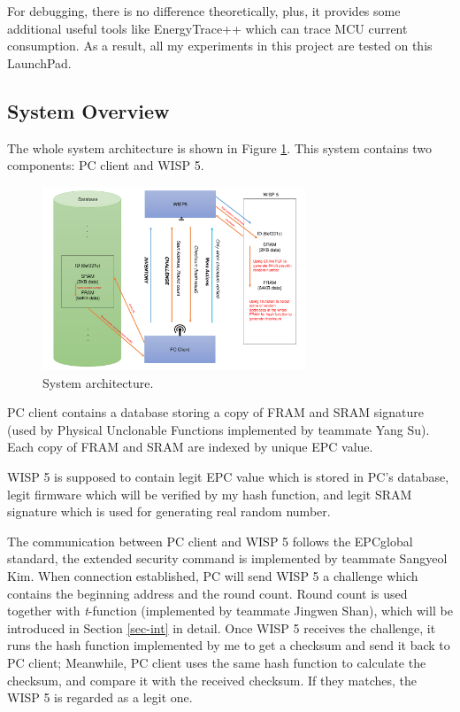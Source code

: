 \documentclass[sigconf, review=false]{acmart}
\let\OldTexttrademark\texttrademark
\renewcommand{\texttrademark}{\OldTexttrademark\xspace}%
\begin{document}
For debugging, there is no difference theoretically, plus, it provides some additional useful tools
like EnergyTrace++\texttrademark which can trace MCU current consumption.
As a result, all my experiments in this project are tested on this LaunchPad.

\subsection{System Overview}
The whole system architecture is shown in Figure \ref{fig-arch}.
This system contains two components: PC client and WISP 5.

\begin{figure}
\centering
\includegraphics[width=0.7\textwidth]{arch.pdf}
\caption{System architecture.}
\label{fig-arch}
\end{figure}

PC client contains a database storing a copy of FRAM and SRAM signature
(used by Physical Unclonable Functions implemented by teammate Yang Su).
Each copy of FRAM and SRAM are indexed by unique EPC value.

WISP 5 is supposed to contain legit EPC value which is stored in PC's database,
legit firmware which will be verified by my hash function,
and legit SRAM signature which is used for generating real random number.

The communication between PC client and WISP 5 follows the EPCglobal standard,
the extended security command is implemented by teammate Sangyeol Kim.
When connection established, PC will send WISP 5 a challenge which contains the beginning address and the round count.
Round count is used together with \textit{t}-function (implemented by teammate Jingwen Shan),
which will be introduced in Section \ref{sec-int} in detail.
Once WISP 5 receives the challenge, it runs the hash function implemented by me to get a checksum and send it back to PC client;
Meanwhile, PC client uses the same hash function to calculate the checksum, and compare it with the received checksum.
If they matches, the WISP 5 is regarded as a legit one.
\end{document}
